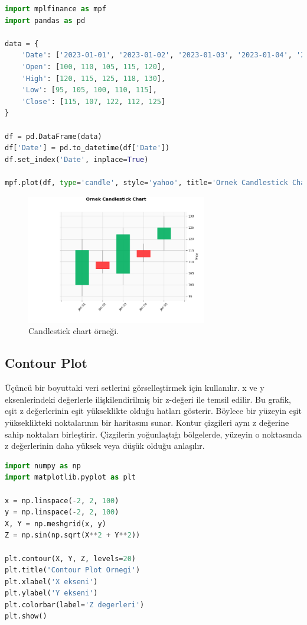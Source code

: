 \begin{lstlisting}[language=Python]
import mplfinance as mpf
import pandas as pd

data = {
    'Date': ['2023-01-01', '2023-01-02', '2023-01-03', '2023-01-04', '2023-01-05'],
    'Open': [100, 110, 105, 115, 120],
    'High': [120, 115, 125, 118, 130],
    'Low': [95, 105, 100, 110, 115],
    'Close': [115, 107, 122, 112, 125]
}

df = pd.DataFrame(data)
df['Date'] = pd.to_datetime(df['Date'])
df.set_index('Date', inplace=True)

mpf.plot(df, type='candle', style='yahoo', title='Ornek Candlestick Chart')
\end{lstlisting}

\begin{figure}[h]
    \centering
    \includegraphics[width=0.7\textwidth]{images/candlestick_chart.png}
    \caption{Candlestick chart örneği.}
    \label{fig:enter-label}
\end{figure}

\newpage

\subsection{Contour Plot}
Üçüncü bir boyuttaki veri setlerini görselleştirmek için kullanılır. x ve y eksenlerindeki değerlerle ilişkilendirilmiş bir z-değeri ile temsil edilir. Bu grafik, eşit z değerlerinin eşit yükseklikte olduğu hatları gösterir. Böylece bir yüzeyin eşit yükseklikteki noktalarının bir haritasını sunar. Kontur çizgileri aynı z değerine sahip noktaları birleştirir. Çizgilerin yoğunlaştığı bölgelerde, yüzeyin o noktasında z değerlerinin daha yüksek veya düşük olduğu anlaşılır.

\begin{lstlisting}[language=Python]
import numpy as np
import matplotlib.pyplot as plt

x = np.linspace(-2, 2, 100)
y = np.linspace(-2, 2, 100)
X, Y = np.meshgrid(x, y)
Z = np.sin(np.sqrt(X**2 + Y**2))

plt.contour(X, Y, Z, levels=20)
plt.title('Contour Plot Ornegi')
plt.xlabel('X ekseni')
plt.ylabel('Y ekseni')
plt.colorbar(label='Z degerleri')
plt.show() 
\end{lstlisting}

